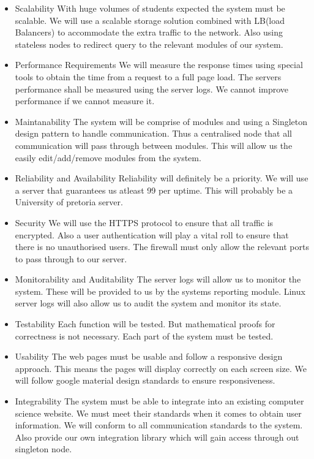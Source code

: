 
%

\begin{itemize}
	\item Scalability
		With huge volumes of students expected the system must be scalable. We will use a scalable storage solution combined with LB(load Balancers) to accommodate the extra traffic to the network. Also using stateless nodes to redirect query to the relevant modules of our system.
	\item Performance Requirements
		We will measure the response times using special tools to obtain the time from a request to a full page load. The servers performance shall be measured using the server logs. We cannot improve performance if we cannot measure it. 
	\item Maintanability
		The system will be comprise of modules and using a Singleton design pattern to handle communication. Thus a centralised node that all communication will pass through between modules. This will allow us the easily edit/add/remove modules from the system.
	\item Reliability and Availability
		Reliability will definitely be a priority. We will use a server that guarantees us atleast 99 per uptime. This will probably be a University of pretoria server.
	\item Security
		We will use the HTTPS protocol to ensure that all traffic is encrypted. Also a user authentication will play a vital roll to ensure that there is no unauthorised users. The firewall must only allow the relevant ports to pass through to our server. 
	\item Monitorability and Auditability
		The server logs will allow us to monitor the system. These will be provided to us by the systems reporting module. Linux server logs will also allow us to audit the system and monitor its state.
	\item Testability
		Each function will be tested. But mathematical proofs for correctness is not necessary. Each part of the system must be tested. 
	\item Usability
		The web pages must be usable and follow a responsive design approach. This means the pages will display correctly on each screen size. We will follow google material design standards to ensure responsiveness.
	\item Integrability
		The system must be able to integrate into an existing computer science website. We must meet their standards when it comes to obtain user information. We will conform to all communication standards to the system. Also provide our own integration library which will gain access through out singleton node.
\end{itemize}

%